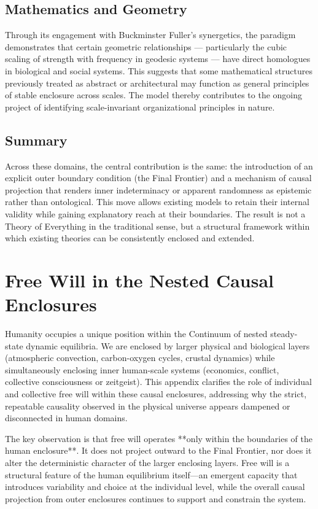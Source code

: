 \section{Mathematics and Geometry}

Through its engagement with Buckminster Fuller’s synergetics, the paradigm demonstrates that certain geometric relationships — particularly the cubic scaling of strength with frequency in geodesic systems — have direct homologues in biological and social systems. This suggests that some mathematical structures previously treated as abstract or architectural may function as general principles of stable enclosure across scales. The model thereby contributes to the ongoing project of identifying scale-invariant organizational principles in nature.

\section{Summary}

Across these domains, the central contribution is the same: the introduction of an explicit outer boundary condition (the Final Frontier) and a mechanism of causal projection that renders inner indeterminacy or apparent randomness as epistemic rather than ontological. This move allows existing models to retain their internal validity while gaining explanatory reach at their boundaries. The result is not a Theory of Everything in the traditional sense, but a structural framework within which existing theories can be consistently enclosed and extended.

\chapter{Free Will in the Nested Causal Enclosures}

Humanity occupies a unique position within the Continuum of nested steady-state dynamic equilibria. We are enclosed by larger physical and biological layers (atmospheric convection, carbon-oxygen cycles, crustal dynamics) while simultaneously enclosing inner human-scale systems (economics, conflict, collective consciousness or zeitgeist). This appendix clarifies the role of individual and collective free will within these causal enclosures, addressing why the strict, repeatable causality observed in the physical universe appears dampened or disconnected in human domains.

The key observation is that free will operates **only within the boundaries of the human enclosure**. It does not project outward to the Final Frontier, nor does it alter the deterministic character of the larger enclosing layers. Free will is a structural feature of the human equilibrium itself—an emergent capacity that introduces variability and choice at the individual level, while the overall causal projection from outer enclosures continues to support and constrain the system.

